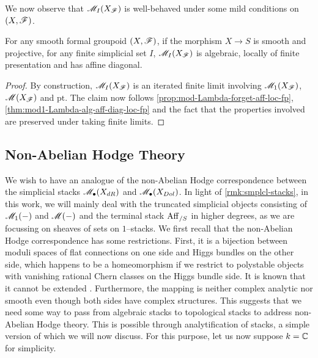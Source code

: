 \documentclass[11pt]{amsart}
\begin{document}
We now observe that $\mathscr{M}_I(X_\mathscr{F})$ is well-behaved under some mild conditions
on $(X, \mathscr{F})$.

\begin{thm}\label{thm:mod-quiv-bun-formal-grpd-loc-fin-pre}
For any smooth formal groupoid $(X, \mathscr{F})$, if the morphism $X \to S$
is smooth and projective, for any finite simplicial set $I$, $\mathscr{M}_I(X_\mathscr{F})$ is
algebraic, locally of finite presentation and has affine diagonal.
\end{thm}
\begin{proof}
By construction, $\mathscr{M}_I(X_\mathscr{F})$ is an iterated finite limit
involving $\mathscr{M}_1(X_\mathscr{F})$, $\mathscr{M}(X_\mathscr{F})$ and $\mathrm{pt}$. The claim now follows
\cref{prop:mod-Lambda-forget-aff-loc-fp},
\cref{thm:mod1-Lambda-alg-aff-diag-loc-fp}
and the fact that the properties involved are preserved under taking finite
limits.
\end{proof}


\subsection{Non-Abelian Hodge Theory}\label{subsec:NonAbHodge}

We wish to have an analogue of the non-Abelian Hodge correspondence between
the simplicial stacks $\mathscr{M}_\bullet(X_{dR})$ and $\mathscr{M}_\bullet(X_{Dol})$.
In light of \cref{rmk:smplcl-stacks}, in this work,
we will mainly deal with the truncated simplicial objects consisting of
$\mathscr{M}_1(-)$ and $\mathscr{M}(-)$ and the terminal stack $\mathrm{Aff}_{/S}$ in higher degrees,
as we are focussing on sheaves of sets on $1$--stacks.
We first recall that the non-Abelian Hodge correspondence has some
restrictions. First, it is a bijection between moduli spaces of flat
connections on one side and Higgs bundles on the other side, which happens to
be a homeomorphism if we restrict to polystable objects with vanishing
rational Chern classes on the Higgs bundle side. It is known that
it cannot be extended
\cite[Counterexample on pages 38---39]{ModRepFunGrpII}. Furthermore,
the mapping is neither complex analytic nor smooth even though both sides have
complex structures. This suggests that we need some way to pass from algebraic
stacks to topological stacks to address non-Abelian Hodge theory.
This is possible through analytification of stacks, a simple version of which
we will now discuss.
For this purpose, let us now suppose $k = \mathbb{C}$ for simplicity.
\end{document}

